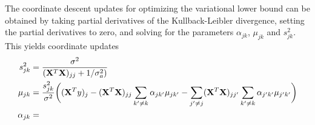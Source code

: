 \documentclass[final]{siamltex}
\begin{document}
The coordinate descent updates for optimizing the variational lower
bound can be obtained by taking partial derivatives of the
Kullback-Leibler divergence, setting the partial derivatives to zero,
and solving for the parameters $\alpha_{jk}$, $\mu_{jk}$ and
$s_{jk}^2$. This yields coordinate updates
\begin{align*}
s_{jk}^2 &= \frac{\sigma^2}{({\bf X}^T{\bf X})_{jj} + 1/\sigma_a^2)} \\
\mu_{jk} &= \frac{s_{jk}^2}{\sigma^2}
\bigg(({\bf X}^Ty)_j 
- ({\bf X}^T{\bf X})_{jj} \sum_{k' \neq k} \alpha_{jk'} \mu_{jk'}
- \sum_{j' \neq j} ({\bf X}^T{\bf X})_{jj'} 
  \sum_{k' \neq k} \alpha_{j'k'} \mu_{j'k'} \bigg) \\
\alpha_{jk} &=
\end{align*}
\end{document}
